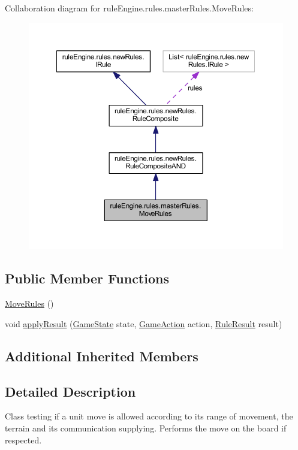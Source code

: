 Collaboration diagram for rule\+Engine.\+rules.\+master\+Rules.\+Move\+Rules\+:
\nopagebreak
\begin{figure}[H]
\begin{center}
\leavevmode
\includegraphics[width=350pt]{classrule_engine_1_1rules_1_1master_rules_1_1_move_rules__coll__graph}
\end{center}
\end{figure}
\subsection*{Public Member Functions}
\begin{DoxyCompactItemize}
\item 
\mbox{\hyperlink{classrule_engine_1_1rules_1_1master_rules_1_1_move_rules_abcaacaa8e37f080a17ae9eda09b0c5cf}{Move\+Rules}} ()
\item 
void \mbox{\hyperlink{classrule_engine_1_1rules_1_1master_rules_1_1_move_rules_a15001f0b477c2f22e75d9d4055019c8b}{apply\+Result}} (\mbox{\hyperlink{classgame_1_1game_state_1_1_game_state}{Game\+State}} state, \mbox{\hyperlink{classrule_engine_1_1_game_action}{Game\+Action}} action, \mbox{\hyperlink{classrule_engine_1_1_rule_result}{Rule\+Result}} result)
\end{DoxyCompactItemize}
\subsection*{Additional Inherited Members}


\subsection{Detailed Description}
Class testing if a unit move is allowed according to its range of movement, the terrain and its communication supplying. Performs the move on the board if respected. 

